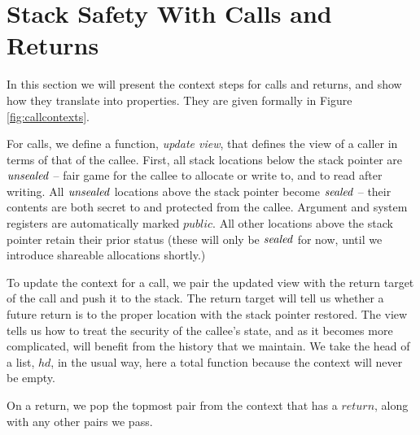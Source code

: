 \documentclass[10pt,conference]{ieeetran}%
\theoremstyle{definition}
\begin{document}

\section{Stack Safety With Calls and Returns}

In this section we will present the context steps for calls and returns,
and show how they translate into properties. They are given formally in
Figure \ref{fig:callcontexts}.

For calls, we define a function, {\it update view}, that defines the view
of a caller in terms of that of the callee.
First, all stack locations below the stack pointer
are \(\mathit{unsealed}\) -- fair game for the callee to allocate or write to, and
to read after writing. All \(\mathit{unsealed}\) locations above the stack pointer
become \(\mathit{sealed}\) -- their contents are both secret to and protected
from the callee. Argument and system registers are automatically marked
\(\mathit{public}\). All other locations above the stack pointer
retain their prior status (these will only be \(\mathit{sealed}\) for now,
until we introduce shareable allocations shortly.)

To update the context for a call, we pair the updated view with the return target of the
call and push it to the stack. The return target will tell us whether a future
return is to the proper location with the stack pointer restored.
The view tells us how to treat the security of the callee's state, and as
it becomes more complicated, will benefit from the history that we maintain.
We take the head of a list, \(\mathit{hd}\), in the usual way, here a
total function because the context will never be empty.

On a return, we pop the topmost pair from the context that has
a \(\mathit{return}\), along with any other pairs we pass.
\end{document}
